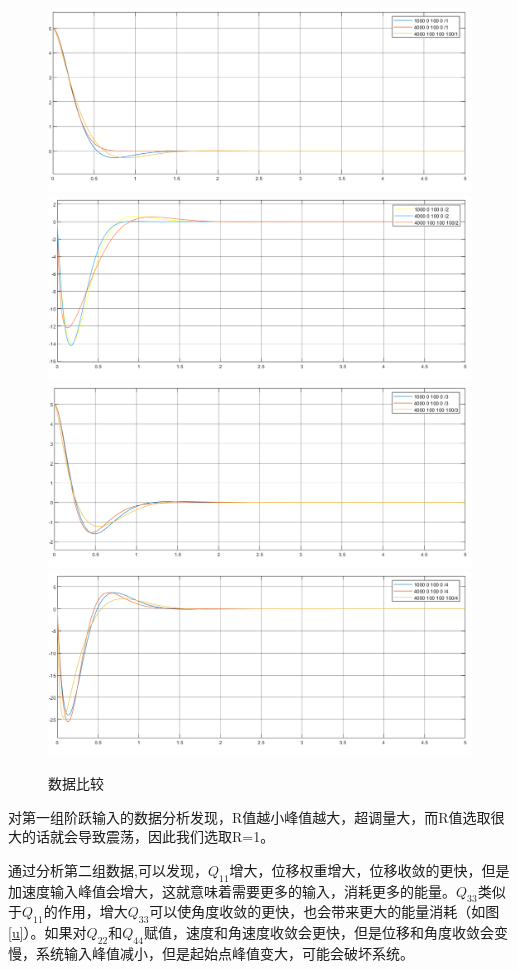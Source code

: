 \begin{figure}[hbpt]
\centering
\includegraphics[width=12cm]{x.png}
\includegraphics[width=12cm]{dotx.png}
\includegraphics[width=12cm]{fai.png}
\includegraphics[width=12cm]{dotfai.png}
\caption{数据比较}\label{data}
\end{figure}

对第一组阶跃输入的数据分析发现，R值越小峰值越大，超调量大，而R值选取很大的话就会导致震荡，因此我们选取R=1。

通过分析第二组数据,可以发现，$Q_{11}$增大，位移权重增大，位移收敛的更快，但是加速度输入峰值会增大，这就意味着需要更多的输入，消耗更多的能量。$Q_{33}$类似于$Q_{11}$的作用，增大$Q_{33}$可以使角度收敛的更快，也会带来更大的能量消耗（如图\ref{u}）。如果对$Q_{22}$和$Q_{44}$赋值，速度和角速度收敛会更快，但是位移和角度收敛会变慢，系统输入峰值减小，但是起始点峰值变大，可能会破坏系统。


